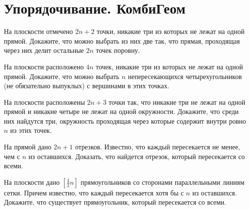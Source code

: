 
\section*{Упорядочивание. КомбиГеом}



\begin{problems}

\item
На плоскости отмечено $2 n + 2$ точки, никакие три из которых не лежат
на одной прямой.
Докажите, что можно выбрать из них две так, что прямая, проходящая через них
делит остальные $2 n$ точек поровну.

\item
На плоскости расположено $4 n$ точек, никакие три из которых не лежат на одной
прямой.
Докажите, что можно выбрать $n$ непересекающихся четырехугольников
(не обязательно выпуклых) с вершинами в этих точках.

\item
На плоскости расположены $2 n + 3$ точки так, что никакие три не лежат
на одной прямой и никакие четыре не лежат на одной окружности.
Докажите, что среди них найдутся три, окружность проходящая через которые
содержит внутри ровно $n$ из этих точек.
    
\item
На прямой дано $2 n + 1$ отрезков.
Известно, что каждый пересекается не менее, чем с $n$ из оставшихся.
Доказать, что найдется отрезок, который пересекается со всеми.

\item
На плоскости дано $\left[\frac{4}{3}n\right]$ прямоугольников со сторонами
параллельными линиям сетки.
Причем известно, что каждый пересекается хотя бы с $n$ из оставшихся.
Докажите, что существует прямоугольник, который пересекается со всеми.

\end{problems}

